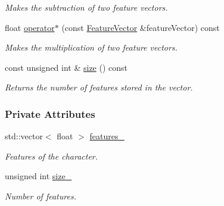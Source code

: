 \begin{CompactItemize}
\begin{CompactList}\small\item\em Makes the subtraction of two feature vectors. \item\end{CompactList}\item 
float \hyperlink{class_feature_vector_a0d4b7f99e906409e1bf2335055e4cfd}{operator$\ast$} (const \hyperlink{class_feature_vector}{FeatureVector} \&featureVector) const 
\begin{CompactList}\small\item\em Makes the multiplication of two feature vectors. \item\end{CompactList}\item 
const unsigned int \& \hyperlink{class_feature_vector_4e3bd39520fdd8afbefa90ed203d512b}{size} () const 
\begin{CompactList}\small\item\em Returns the number of features stored in the vector. \item\end{CompactList}\end{CompactItemize}
\subsubsection*{Private Attributes}
\begin{CompactItemize}
\item 
\hypertarget{class_feature_vector_94d8f46966fa05f81a927b06ace11c28}{
std::vector$<$ float $>$ \hyperlink{class_feature_vector_94d8f46966fa05f81a927b06ace11c28}{features\_\-}}
\label{class_feature_vector_94d8f46966fa05f81a927b06ace11c28}

\begin{CompactList}\small\item\em Features of the character. \item\end{CompactList}\item 
\hypertarget{class_feature_vector_262592d779f18095c8213c0424edf25d}{
unsigned int \hyperlink{class_feature_vector_262592d779f18095c8213c0424edf25d}{size\_\-}}
\label{class_feature_vector_262592d779f18095c8213c0424edf25d}

\begin{CompactList}\small\item\em Number of features. \item\end{CompactList}\end{CompactItemize}


